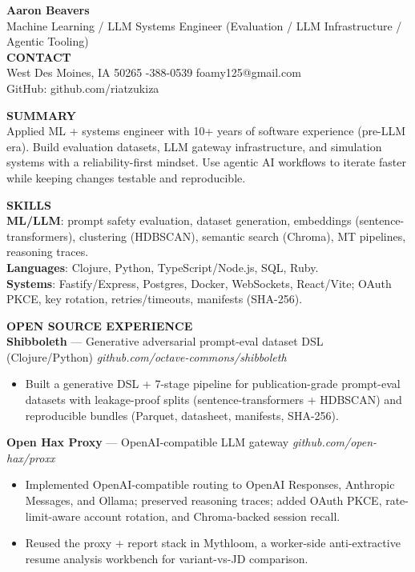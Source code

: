 \documentclass[10pt]{article}
\begin{document}
{\LARGE \textbf{Aaron Beavers}}\\
Machine Learning / LLM Systems Engineer (Evaluation / LLM Infrastructure / Agentic Tooling)\\

\vspace{2pt}
\textbf{CONTACT}\\
West Des Moines, IA 50265 \;\;\textbar\;-388-0539 \;\;\textbar\;\; foamy125@gmail.com\\
GitHub: github.com/riatzukiza

\vspace{4pt}
\textbf{SUMMARY}\\
Applied ML + systems engineer with 10+ years of software experience (pre-LLM era). Build evaluation datasets, LLM gateway infrastructure, and simulation systems with a reliability-first mindset. Use agentic AI workflows to iterate faster while keeping changes testable and reproducible.

\vspace{2pt}
\textbf{SKILLS}\\
\textbf{ML/LLM}: prompt safety evaluation, dataset generation, embeddings (sentence-transformers), clustering (HDBSCAN), semantic search (Chroma), MT pipelines, reasoning traces.\\
\textbf{Languages}: Clojure, Python, TypeScript/Node.js, SQL, Ruby.\\
\textbf{Systems}: Fastify/Express, Postgres, Docker, WebSockets, React/Vite; OAuth PKCE, key rotation, retries/timeouts, manifests (SHA-256).

\vspace{4pt}
\textbf{OPEN SOURCE EXPERIENCE}\\

\textbf{Shibboleth} --- Generative adversarial prompt-eval dataset DSL (Clojure/Python) \hfill \textit{github.com/octave-commons/shibboleth}\\
\vspace{-6pt}
\begin{itemize}
  \setlength\itemsep{-2pt}
  \setlength\parskip{0pt}
  \setlength\parsep{0pt}
  \item Built a generative DSL + 7-stage pipeline for publication-grade prompt-eval datasets with leakage-proof splits (sentence-transformers + HDBSCAN) and reproducible bundles (Parquet, datasheet, manifests, SHA-256).
\end{itemize}

\textbf{Open Hax Proxy} --- OpenAI-compatible LLM gateway \hfill \textit{github.com/open-hax/proxx}\\
\vspace{-6pt}
\begin{itemize}
  \setlength\itemsep{-2pt}
  \setlength\parskip{0pt}
  \setlength\parsep{0pt}
  \item Implemented OpenAI-compatible routing to OpenAI Responses, Anthropic Messages, and Ollama; preserved reasoning traces; added OAuth PKCE, rate-limit-aware account rotation, and Chroma-backed session recall.
  \item Reused the proxy + report stack in Mythloom, a worker-side anti-extractive resume analysis workbench for variant-vs-JD comparison.
\end{itemize}
\end{document}
